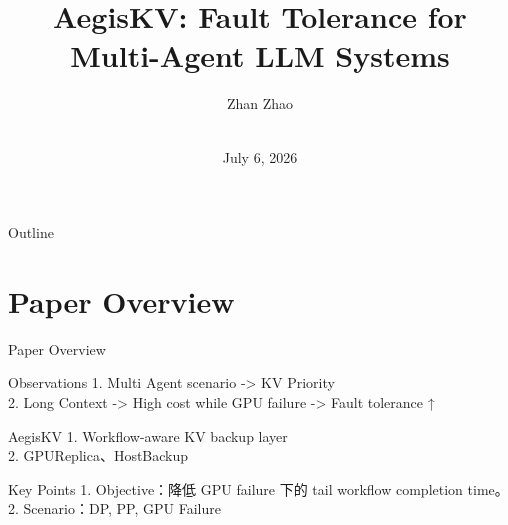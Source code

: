 \documentclass[aspectratio=43]{beamer}
\title{AegisKV: Fault Tolerance for Multi-Agent LLM Systems}
\author[Z Zhao]{Zhan Zhao}
\institute[HKBU]{Hong Kong Baptist University}
\date[2026.07.06]{\meetingname\\July 6, 2026}
\begin{document}
\begin{frame}[plain]
  \titlepage
\end{frame}

\begin{frame}{Outline}
  \tableofcontents
\end{frame}

\section{Paper Overview}

\begin{frame}{Paper Overview}
  \small
  \begin{block}{Observations}
    1. Multi Agent scenario -> KV Priority \\
    2. Long Context -> High cost while GPU failure -> Fault tolerance ↑
  \end{block}

  \vspace{0.08cm}
  \begin{block}{AegisKV}
    1. Workflow-aware KV backup layer \\
    2. GPUReplica、HostBackup
  \end{block}

  \vspace{0.08cm}
  \begin{block}{Key Points}
    1. Objective：降低 GPU failure 下的 tail workflow completion time。 \\
    2. Scenario：DP, PP, GPU Failure \\
  \end{block}
\end{frame}
\end{document}
